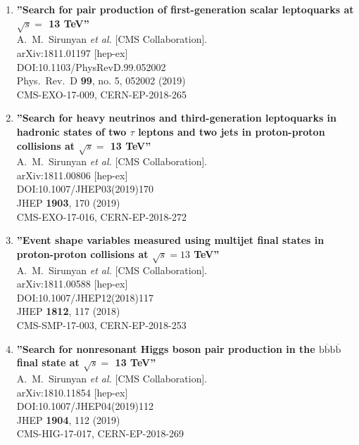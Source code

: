 \begin{enumerate}
\item%
{\bf ''Search for pair production of first-generation scalar leptoquarks at $\sqrt{s} =$ 13  TeV''}
  \\{}A.~M.~Sirunyan {\it et al.} [CMS Collaboration].
  \\{}arXiv:1811.01197 [hep-ex]
  \\{}DOI:10.1103/PhysRevD.99.052002
  \\{}Phys.\ Rev.\ D {\bf 99}, no. 5, 052002 (2019)
  \\{}CMS-EXO-17-009, CERN-EP-2018-265

\item%
{\bf ''Search for heavy neutrinos and third-generation leptoquarks in hadronic states of two $\tau$ leptons and two jets in proton-proton collisions at $\sqrt{s} =$ 13 TeV''}
  \\{}A.~M.~Sirunyan {\it et al.} [CMS Collaboration].
  \\{}arXiv:1811.00806 [hep-ex]
  \\{}DOI:10.1007/JHEP03(2019)170
  \\{}JHEP {\bf 1903}, 170 (2019)
  \\{}CMS-EXO-17-016, CERN-EP-2018-272

\item%
{\bf ''Event shape variables measured using multijet final states in proton-proton collisions at $ \sqrt{s}=13 $ TeV''}
  \\{}A.~M.~Sirunyan {\it et al.} [CMS Collaboration].
  \\{}arXiv:1811.00588 [hep-ex]
  \\{}DOI:10.1007/JHEP12(2018)117
  \\{}JHEP {\bf 1812}, 117 (2018)
  \\{}CMS-SMP-17-003, CERN-EP-2018-253

\item%
{\bf ''Search for nonresonant Higgs boson pair production in the $\mathrm{b\overline{b}b\overline{b}}$ final state at $\sqrt{s} =$ 13 TeV''}
  \\{}A.~M.~Sirunyan {\it et al.} [CMS Collaboration].
  \\{}arXiv:1810.11854 [hep-ex]
  \\{}DOI:10.1007/JHEP04(2019)112
  \\{}JHEP {\bf 1904}, 112 (2019)
  \\{}CMS-HIG-17-017, CERN-EP-2018-269


\end{enumerate}
